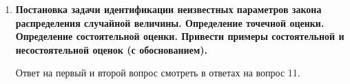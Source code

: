 \documentclass[12pt]{report}
\begin{document}
\begin{enumerate}
	\item \textbf{Постановка задачи идентификации неизвестных параметров закона распределения случайной величины. Определение точечной оценки. Определение состоятельной оценки. Привести
		примеры состоятельной и несостоятельной оценок (с обоснованием).}
	
	Ответ на первый и второй вопрос смотреть в ответах на вопрос 11.
	
	\begin{figure}[!h]
	\end{figure}
	\begin{figure}[!h]
	\end{figure}
	\begin{figure}[!h]

\end{figure}
\end{enumerate}
\end{document}

